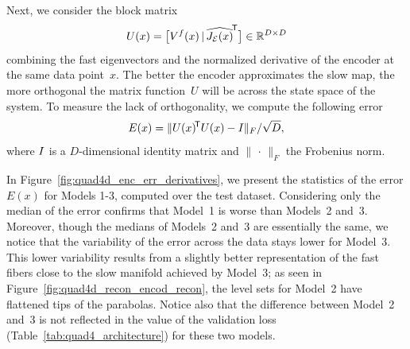 \documentclass{article}
\newcommand{\enc}{\mathcal{E}} %
\newcommand{\jac}[1]{J_{#1}} %
\begin{document}
Next, we consider the block matrix
\begin{equation*}
    U(x) = \big[V^f(x)\,|\,\tp{\ohat{\jac{\enc}(x)}}\big]\in\mat{D}{D}
\end{equation*}
combining the fast eigenvectors and the normalized derivative of the encoder at the same data point~$x$. The better the encoder approximates the slow map, the more orthogonal the matrix function~$U$ will be across the state space of the system. To measure the lack of orthogonality, we compute the following error
\begin{equation}\label{eq:ortho_err}
    E(x) = \|U(x)^{\!\mathsf{T}}U(x) - {I}\|_{F} / \sqrt{D},
\end{equation}
where ${I}$ is a $D$-dimensional identity matrix and $\|\,\cdot\,\|_F$ the Frobenius norm.

In Figure~\ref{fig:quad4d_enc_err_derivatives}, we present the statistics of the error $E(x)$ for Models 1-3, computed over the test dataset. Considering only the median of the error confirms that Model~1 is worse than Models~2 and~3. Moreover, though the medians of Models~2 and~3 are essentially the same, we notice that the variability of the error across the data stays lower for Model~3. This lower variability results from a slightly better representation of the fast fibers close to the slow manifold achieved by Model~3; as seen in Figure~\ref{fig:quad4d_recon_encod_recon}, the level sets for Model~2 have flattened tips of the parabolas. Notice also that the difference between Model~2 and~3 is not reflected in the value of the validation loss (Table~\ref{tab:quad4_architecture}) for these two models.
\end{document}
